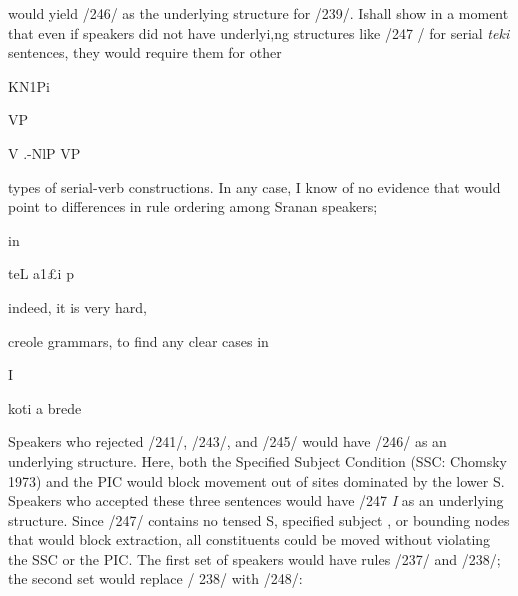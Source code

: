 \z


\ea\label{ex:2:247}

\z

would yield /246/ as the underlying structure for /239/. Ishall show in a moment that even if speakers did not have underlyi,ng structures like /247 / for serial \textit{teki} sentences, they would require them for other

\ea
KN1Pi

VP

V .{}-NlP VP
\z

types of serial-verb constructions. In any case, I know of no evidence that would point to differences in rule ordering among Sranan speakers;

in

teL a1£i p

indeed, it is very hard,

creole grammars, to find any clear cases in

I 

koti a brede

Speakers who rejected /241/, /243/, and /245/ would have
/246/ as an underlying structure. Here, both the Specified Subject Condition (SSC: Chomsky 1973) and the PIC would block movement out of sites dominated by the lower S. Speakers who accepted these three sentences would have /247 \textit{I} as an underlying structure. Since
/247/ contains no tensed S, specified subject , or bounding nodes that would block extraction, all constituents could be moved without violating the SSC or the PIC. The first set of speakers would have rules
/237/ and /238/; the second set would replace / 238/ with /248/:

